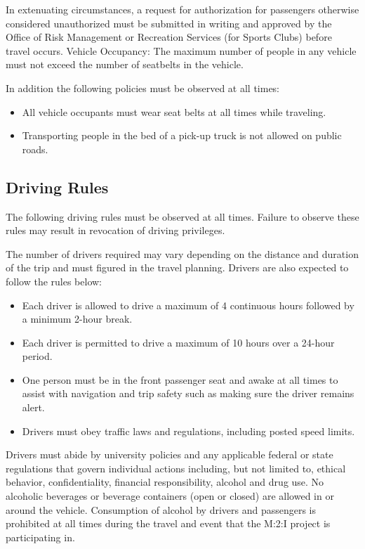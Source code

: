 {In extenuating circumstances, a request for authorization for passengers otherwise considered unauthorized must be submitted in writing and approved by the Office of Risk Management or Recreation Services (for Sports Clubs) before travel occurs.
Vehicle Occupancy: The maximum number of people in any vehicle must not exceed the number of seatbelts in the vehicle.

In addition the following policies must be observed at all times:

\begin{itemize}
\item All vehicle occupants must wear seat belts at all times while traveling.
\item Transporting people in the bed of a pick-up truck is not allowed on public roads.
\end{itemize}

\subsection{Driving Rules}
The following driving rules must be observed at all times.  Failure to observe these rules may result in revocation of driving privileges.  

The number of drivers required may vary depending on the distance and duration of the trip and must figured in the travel planning.  Drivers are also expected to follow the rules below:

\begin{itemize}
\item Each driver is allowed to drive a maximum of 4 continuous hours followed by a minimum 2-hour break.
\item Each driver is permitted to drive a maximum of 10 hours over a 24-hour period.
\item One person must be in the front passenger seat and awake at all times to assist with navigation and trip safety such as making sure the driver remains alert.
\item Drivers must obey traffic laws and regulations, including posted speed limits.
\end{itemize}

Drivers must abide by university policies and any applicable federal or state regulations that govern individual actions including, but not limited to, ethical behavior, confidentiality, financial responsibility, alcohol and drug use.  No alcoholic beverages or beverage containers (open or closed) are allowed in or around the vehicle. Consumption of alcohol by drivers and passengers is prohibited at all times during the travel and event that the M:2:I project is participating in.  

}
